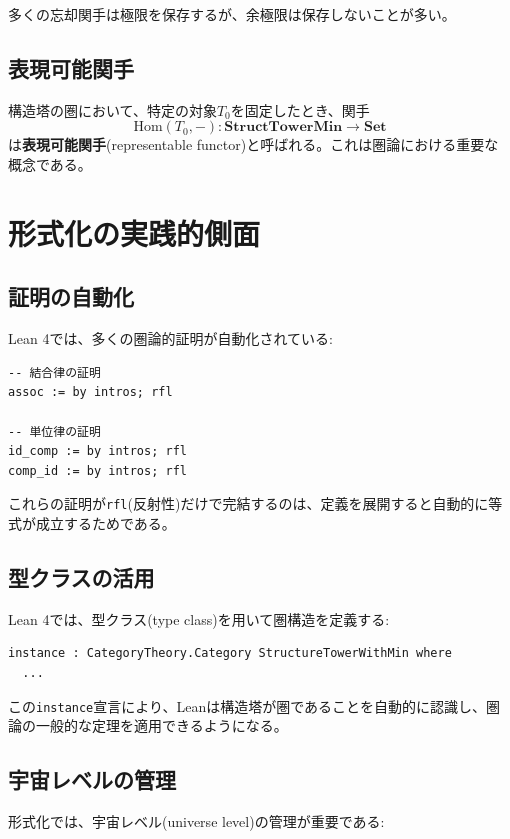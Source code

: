 \documentclass[a4paper,12pt]{article}
\theoremstyle{definition}
\begin{document}
多くの忘却関手は極限を保存するが、余極限は保存しないことが多い。

\subsection{表現可能関手}

構造塔の圏において、特定の対象$T_0$を固定したとき、関手
\[
\text{Hom}(T_0, -) : \mathbf{StructTowerMin} \to \mathbf{Set}
\]
は\textbf{表現可能関手}(representable functor)と呼ばれる。これは圏論における重要な概念である。

\section{形式化の実践的側面}

\subsection{証明の自動化}

Lean 4では、多くの圏論的証明が自動化されている:

\begin{lstlisting}[style=leanstyle, language=ML]
-- 結合律の証明
assoc := by intros; rfl

-- 単位律の証明
id_comp := by intros; rfl
comp_id := by intros; rfl
\end{lstlisting}

これらの証明が\texttt{rfl}(反射性)だけで完結するのは、定義を展開すると自動的に等式が成立するためである。

\subsection{型クラスの活用}

Lean 4では、型クラス(type class)を用いて圏構造を定義する:

\begin{lstlisting}[style=leanstyle, language=ML]
instance : CategoryTheory.Category StructureTowerWithMin where
  ...
\end{lstlisting}

この\texttt{instance}宣言により、Leanは構造塔が圏であることを自動的に認識し、圏論の一般的な定理を適用できるようになる。

\subsection{宇宙レベルの管理}

形式化では、宇宙レベル(universe level)の管理が重要である:
\end{document}
